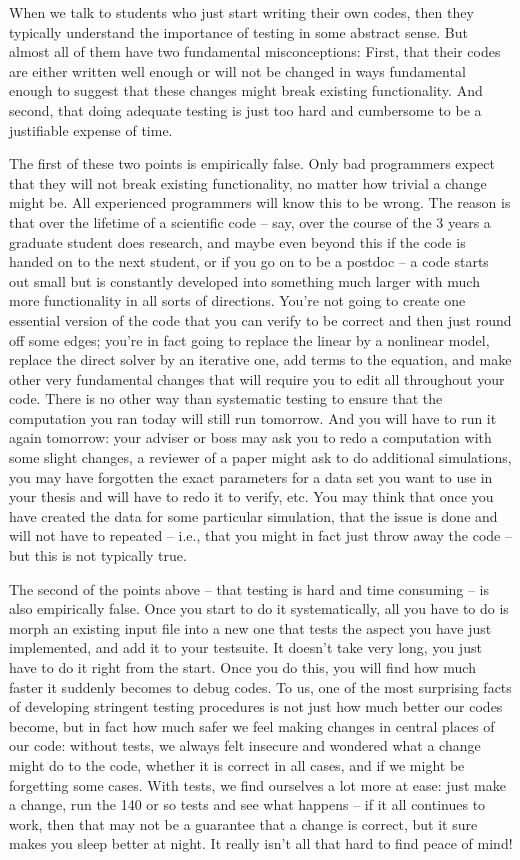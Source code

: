 \documentclass{article}
\begin{document}
When we talk to students who just start writing their own codes, then
they typically understand the importance of testing in some abstract
sense. But almost all of them have two fundamental misconceptions: First, that
their codes are either written well enough or will not be changed in ways
fundamental enough to suggest that these changes might break existing
functionality. And second, that doing adequate testing is just too hard and
cumbersome to be a justifiable expense of time.

The first of these two points is empirically false. Only bad programmers
expect that they will not break existing functionality, no matter how trivial
a change might be. All experienced programmers will know this to be wrong. The
reason is that over the lifetime of a scientific code -- say, over the course of
the 3 years a graduate student does research, and maybe even beyond this if
the code is handed on to the next student, or if you go on to be a postdoc --
a code starts out small but is constantly developed into something much larger
with much more functionality in all sorts of directions. You're not going to
create one essential version of the code that you can verify to be correct and
then just round off some edges; you're in fact going to replace the linear by
a nonlinear model, replace the direct solver by an iterative one, add terms to
the equation, and make other very fundamental changes that will require you to
edit all throughout your code. There is no other way than systematic testing
to ensure that the computation you ran today will still run tomorrow. And you
will have to run it again tomorrow: your adviser or boss may ask you to redo a
computation with some slight changes, a reviewer of a paper might ask to do
additional simulations, you may have forgotten the exact parameters for a data
set you want to use in your thesis and will have to redo it to verify,
etc. You may think that once you have created the data 
for some particular simulation, that the issue is done and will not have to
repeated -- i.e., that you might in fact just throw away the code -- but this
is not typically true.

The second of the points above -- that testing is hard and time consuming --
is also empirically false. Once you start to do it systematically, all you
have to do is morph an existing input file into a new one that tests the
aspect you have just implemented, and add it to your testsuite. It doesn't
take very long, you just have to do it right from the start. Once you do this,
you will find how much faster it suddenly becomes to debug codes. To us, one
of the most surprising facts of developing stringent testing procedures is not
just how much better our codes become, but in fact how much safer we feel
making changes in central places of our code: without tests, we always felt
insecure and wondered what a change might do to the code, whether it is
correct in all cases, and if we might be forgetting some cases. With tests,
we find ourselves a lot more at ease: just make a change, run the 140 or so
tests and see what happens -- if it all continues to work, then that may not
be a guarantee that a change is correct, but it sure makes you sleep better at
night. It really isn't all that hard to find peace of mind!
\end{document}
